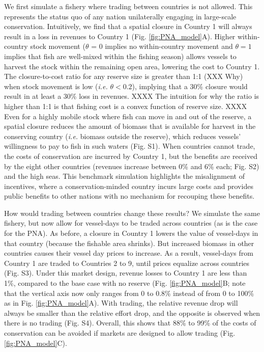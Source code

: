 \documentclass[12pt]{article}
\begin{document}
We first simulate a fishery where trading between countries is not allowed. This represents the status quo of any nation unilaterally engaging in large-scale conservation. Intuitively, we find that a spatial closure in Country 1 will always result in a loss in revenues to Country 1 (Fig. \ref{fig:PNA_model}A). Higher within-country stock movement ($\theta$ = 0 implies no within-country movement and $\theta = 1$ implies that fish are well-mixed within the fishing season) allows vessels to harvest the stock within the remaining open area, lowering the cost to Country 1. The closure-to-cost ratio for any reserve size is greater than 1:1 (XXX Why) when stock movement is low (\emph{i.e.} $\theta < 0.2$), implying that a 30\% closure would result in at least a 30\% loss in revenues. XXXX The intuition for why the ratio is higher than 1:1 is that fishing cost is a convex function of reserve size. XXXX Even for a highly mobile stock where fish can move in and out of the reserve, a spatial closure reduces the amount of biomass that is available for harvest in the conserving country (\emph{i.e.} biomass outside the reserve), which reduces vessels' willingness to pay to fish in such waters (Fig. S1). When countries cannot trade, the costs of conservation are incurred by Country 1, but the benefits are received by the eight other countries (revenues increase between 0\% and 6\% each; Fig. S2) and the high seas. This benchmark simulation highlights the misalignment of incentives, where a conservation-minded country incurs large costs and provides public benefits to other nations with no mechanism for recouping these benefits.

How would trading between countries change these results? We simulate the same fishery, but now allow for vessel-days to be traded across countries (as is the case for the PNA). As before, a closure in Country 1 lowers the value of vessel-days in that country (because the fishable area shrinks). But increased biomass in other countries causes their vessel day prices to increase. As a result, vessel-days from Country 1 are traded to Countries 2 to 9, until prices equalize across countries (Fig. S3). Under this market design, revenue losses to Country 1 are less than 1\%, compared to the base case with no reserve (Fig. \ref{fig:PNA_model}B; note that the vertical axis now only ranges from 0 to 0.8\% instead of from 0 to 100\% as in Fig. \ref{fig:PNA_model}A). With trading, the relative revenue drop will always be smaller than the relative effort drop, and the opposite is observed when there is no trading (Fig. S4). Overall, this shows that 88\% to 99\% of the costs of conservation can be avoided if markets are designed to allow trading (Fig. \ref{fig:PNA_model}C).
\end{document}
